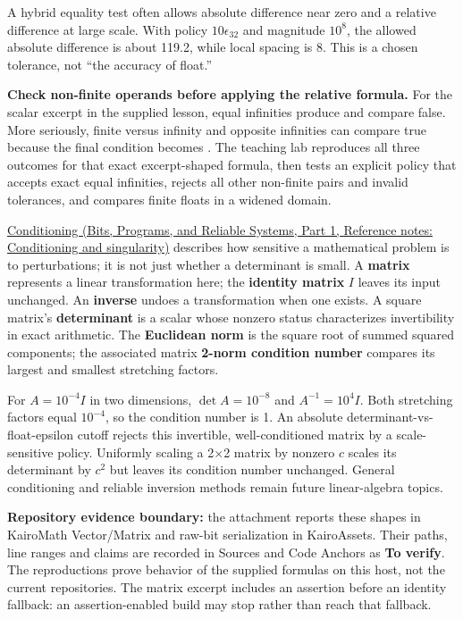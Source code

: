 A hybrid equality test often allows absolute difference near zero and a relative difference at large scale. With policy \(10\epsilon_{32}\) and magnitude \(10^8\), the allowed absolute difference is about 119.2, while local spacing is 8. This is a chosen tolerance, not ``the accuracy of float.''

\textbf{Check non-finite operands before applying the relative formula.} For the scalar excerpt in the supplied lesson, equal infinities produce  and compare false. More seriously, finite versus infinity and opposite infinities can compare true because the final condition becomes . The teaching lab reproduces all three outcomes for that exact excerpt-shaped formula, then tests an explicit policy that accepts exact equal infinities, rejects all other non-finite pairs and invalid tolerances, and compares finite floats in a widened domain.

\href{../01-Bits-Programs-and-Reliable-Systems-P01/main.pdf\#nameddest=appendix-8f6a01f284a7}{Conditioning (Bits, Programs, and Reliable Systems, Part 1, Reference notes: Conditioning and singularity)} describes how sensitive a mathematical problem is to perturbations; it is not just whether a determinant is small. A \textbf{matrix} represents a linear transformation here; the \textbf{identity matrix} \(I\) leaves its input unchanged. An \textbf{inverse} undoes a transformation when one exists. A square matrix's \textbf{determinant} is a scalar whose nonzero status characterizes invertibility in exact arithmetic. The \textbf{Euclidean norm} is the square root of summed squared components; the associated matrix \textbf{2-norm condition number} compares its largest and smallest stretching factors.

For \(A=10^{-4}I\) in two dimensions, \(\det A=10^{-8}\) and \(A^{-1}=10^4I\). Both stretching factors equal \(10^{-4}\), so the condition number is 1. An absolute determinant-vs-float-epsilon cutoff rejects this invertible, well-conditioned matrix by a scale-sensitive policy. Uniformly scaling a 2×2 matrix by nonzero \(c\) scales its determinant by \(c^2\) but leaves its condition number unchanged. General conditioning and reliable inversion methods remain future linear-algebra topics.

\textbf{Repository evidence boundary:} the attachment reports these shapes in KairoMath Vector/Matrix and raw-bit serialization in KairoAssets. Their paths, line ranges and claims are recorded in Sources and Code Anchors as \textbf{To verify}. The reproductions prove behavior of the supplied formulas on this host, not the current repositories. The matrix excerpt includes an assertion before an identity fallback: an assertion-enabled build may stop rather than reach that fallback.

